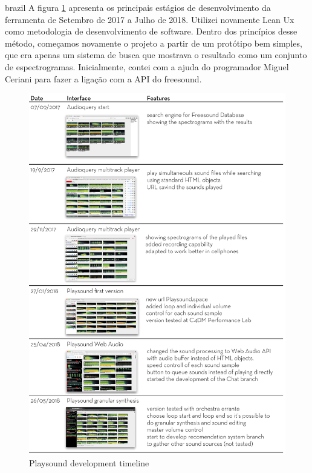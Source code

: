 \begin{otherlanguage*}{brazil}
A figura \ref{fig:timeline} apresenta os principais estágios de desenvolvimento da ferramenta de Setembro de 2017 a Julho de 2018. Utilizei novamente Lean Ux \cite{Liikkanen2014} como metodologia de desenvolvimento de software. Dentro dos princípios desse método, começamos novamente o projeto a partir de um protótipo bem simples, que era apenas um sistema de busca que mostrava o resultado como um conjunto de espectrogramas. Inicialmente, contei com a ajuda do programador Miguel Ceriani para fazer a ligação com a API do freesound.

\begin{figure}
\centering
\includegraphics[width=1\textwidth]{pictures/playsoundtimeline}
\caption{\label{pstimeline}Playsound development timeline}
\label{fig:timeline}
\end{figure}


\end{otherlanguage*}
